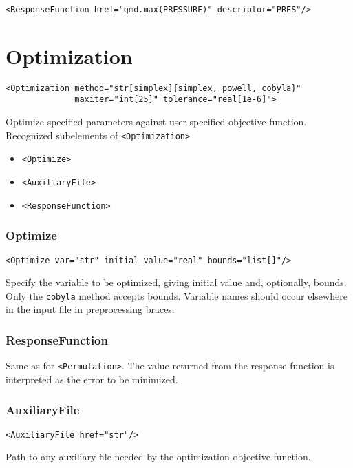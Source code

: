 \documentclass[11pt]{report}
\renewcommand{\tag}[1]{\texttt{<#1>}}
\begin{document}
\begin{verbatim}
<ResponseFunction href="gmd.max(PRESSURE)" descriptor="PRES"/>
\end{verbatim}

\chapter{Optimization}
\begin{verbatim}
<Optimization method="str[simplex]{simplex, powell, cobyla}"
              maxiter="int[25]" tolerance="real[1e-6]">
\end{verbatim}
%
Optimize specified parameters against user specified objective function.
Recognized subelements of \tag{Optimization}

\begin{itemize}
  \item \tag{Optimize}
  \item \tag{AuxiliaryFile}
  \item \tag{ResponseFunction}
\end{itemize}

\subsection{Optimize}
\begin{verbatim}
<Optimize var="str" initial_value="real" bounds="list[]"/>
\end{verbatim}
%
Specify the variable to be optimized, giving initial value and, optionally,
bounds.  Only the \texttt{cobyla} method accepts bounds.  Variable names should
occur elsewhere in the input file in preprocessing braces.

\subsection{ResponseFunction}
Same as for \tag{Permutation}.  The value returned from the response function
is interpreted as the error to be minimized.

\subsection{AuxiliaryFile}
\begin{verbatim}
<AuxiliaryFile href="str"/>
\end{verbatim}
Path to any auxiliary file needed by the optimization objective function.
\end{document}
